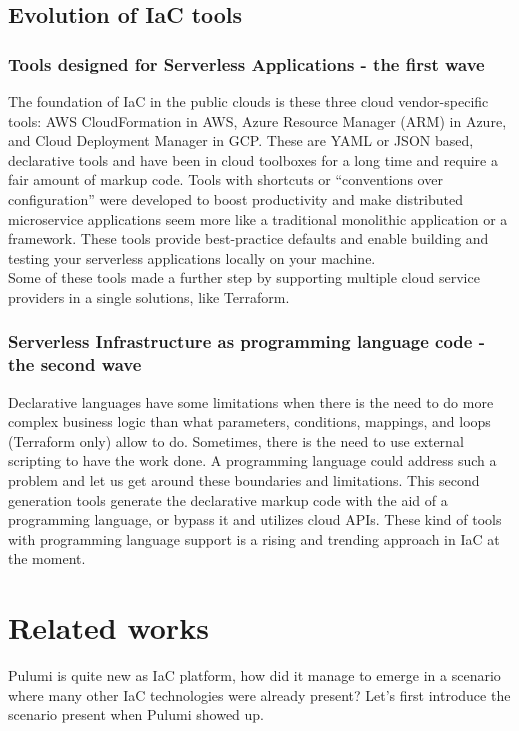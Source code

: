 \subsection{Evolution of IaC tools}

\subsubsection{Tools designed for Serverless Applications - the first wave}
The foundation of IaC in the public clouds is these three cloud vendor-specific tools: AWS \gls{CloudFormation} in \gls{AWS}, \gls{Azure Resource Manager} (ARM) in \gls{Azure}, and \gls{Cloud Deployment Manager} in \gls{GCP}.
These are YAML or JSON based, declarative tools and have been in cloud toolboxes for a long time and require a fair amount of markup code.
Tools with shortcuts or “conventions over configuration” were developed to boost productivity and make distributed microservice applications seem more like a traditional monolithic application or a framework.
These tools provide best-practice defaults and enable building and testing your serverless applications locally on your machine.\\
Some of these tools made a further step by supporting multiple cloud service providers in a single solutions, like Terraform.
\subsubsection{Serverless Infrastructure as programming language code - the second wave}
\label{sssec:second-wave}
Declarative languages have some limitations when there is the need to do more complex business logic than what parameters, conditions, mappings, and loops (Terraform only) allow to do.
Sometimes, there is the need to use external scripting to have the work done.
A programming language could address such a problem and let us get around these boundaries and limitations.
This second generation tools generate the declarative markup code with the aid of a programming language, or bypass it and utilizes cloud APIs.
These kind of tools with programming language support is a rising and trending approach in IaC at the moment.

\section{Related works}
Pulumi is quite new as IaC platform, how did it manage to emerge in a scenario where many other IaC technologies were already present?
Let's first introduce the scenario present when Pulumi showed up.

